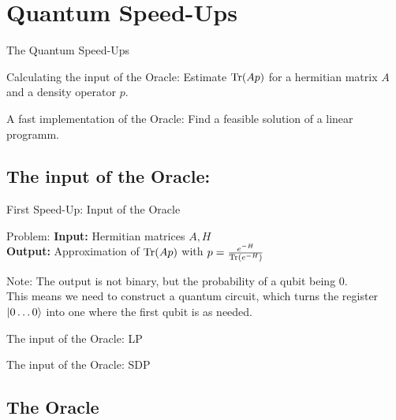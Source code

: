 \section{Quantum Speed-Ups}


\begin{frame}{The Quantum Speed-Ups}
 \begin{block}{Calculating the input of the Oracle:}
  Estimate $\operatorname{Tr}(Ap)$ for a hermitian matrix $A$ and a density operator $p$.
 \end{block}
 
 \begin{block}{A fast implementation of the Oracle:}
  Find a feasible solution of a linear programm.
 \end{block}
\end{frame}

\subsection{The input of the Oracle:}

\begin{frame}{First Speed-Up: Input of the Oracle}
 \begin{block}{Problem:}
  \textbf{Input:} Hermitian matrices $A,H$ \\
  \textbf{Output:} Approximation of $\operatorname{Tr}(Ap)$ with $p=\frac{e^{-H}}{\operatorname{Tr}(e^{-H})}$
 \end{block}
 
 \begin{block}{Note:}
  The output is not binary, but the probability of a qubit being $0$.\\
  \alert{This means we need to construct a quantum circuit, which turns the register $\ket{0\ldots 0}$ into one where the first qubit is as needed.}
 \end{block} 
\end{frame}

\begin{frame}{The input of the Oracle: LP}

\end{frame}

\begin{frame}{The input of the Oracle: SDP}

\end{frame}

\subsection{The Oracle}

